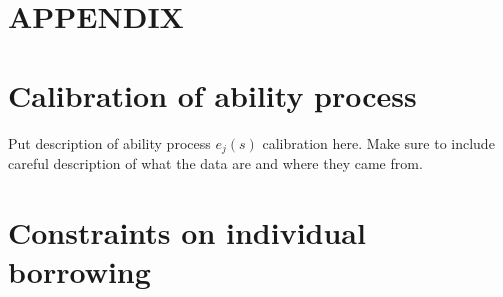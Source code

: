 \documentclass[letterpaper,12pt]{article}
\theoremstyle{definition}
\begin{document}
\begin{spacing}{1.5}


\clearpage
\end{spacing}

\newpage
\renewcommand{\theequation}{A.\arabic{section}.\arabic{equation}}
\renewcommand{\thesection}{A-\arabic{section}}   %
\setcounter{equation}{0}                         %
\setcounter{section}{0}                          %
\section*{APPENDIX}                              %

\section{Calibration of ability process}\label{AppAbilCalib}

  Put description of ability process $e_j(s)$ calibration here. Make sure to include careful description of what the data are and where they came from.


\newpage
\section{Constraints on individual borrowing}\label{AppBorConstr}
\end{document}
